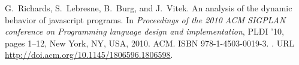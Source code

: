 \documentclass[10pt]{sigplanconf}
\begin{document}
\begin{thebibliography}{27}
G.~Richards, S.~Lebresne, B.~Burg, and J.~Vitek.
\newblock An analysis of the dynamic behavior of javascript programs.
\newblock In \emph{Proceedings of the 2010 ACM SIGPLAN conference on
  Programming language design and implementation}, PLDI '10, pages 1--12, New
  York, NY, USA, 2010. ACM.
\newblock ISBN 978-1-4503-0019-3.
\newblock {}.
\newblock URL \url{http://doi.acm.org/10.1145/1806596.1806598}.

\end{thebibliography}
\end{document}
